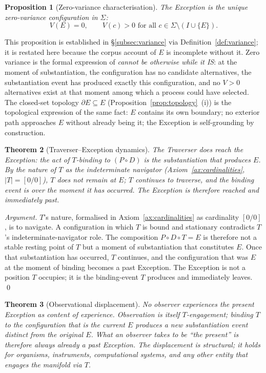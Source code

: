 \documentclass[11pt,a4paper]{article}
\newtheorem{theorem}{Theorem}[section]
\newtheorem{proposition}[theorem]{Proposition}
\theoremstyle{definition}
\theoremstyle{remark}
\begin{document}
\begin{proposition}[Zero-variance characterisation]\label{prop:E-zero-variance}
The Exception is the unique zero-variance configuration in $\Sigma$:
\[
V(E) = 0, \qquad V(c) > 0 \text{ for all } c \in \Sigma\setminus(I\cup\{E\}).
\]
\end{proposition}

This proposition is established in \S\ref{subsec:variance} via Definition~\ref{def:variance}; it is restated here because the corpus account of $E$ is incomplete without it. Zero variance is the formal expression of \emph{cannot be otherwise while it IS}: at the moment of substantiation, the configuration has no candidate alternatives, the substantiation event has produced exactly this configuration, and no $V > 0$ alternatives exist at that moment among which a process could have selected. The closed-set topology $\partial E \subseteq E$ (Proposition~\ref{prop:topology}~(i)) is the topological expression of the same fact: $E$ contains its own boundary; no exterior path approaches $E$ without already being it; the Exception is self-grounding by construction.

\begin{theorem}[Traverser--Exception dynamics]\label{thm:exception-T-dynamics}
The Traverser does reach the Exception: the act of $T$-binding to $(P\circ D)$ \emph{is} the substantiation that produces $E$. By the nature of $T$ as the indeterminate navigator (Axiom~\ref{ax:cardinalities}, $|T| = [0/0]$), $T$ does not remain at $E$; $T$ continues to traverse, and the binding event is over the moment it has occurred. The Exception is therefore reached and immediately past.
\end{theorem}

\begin{proof}[Argument]
$T$'s nature, formalised in Axiom~\ref{ax:cardinalities} as cardinality $[0/0]$, is to navigate. A configuration in which $T$ is bound and stationary contradicts $T$'s indeterminate-navigator role. The composition $P\circ D\circ T = E$ is therefore not a stable resting point of $T$ but a moment of substantiation that constitutes $E$. Once that substantiation has occurred, $T$ continues, and the configuration that was $E$ at the moment of binding becomes a past Exception. The Exception is not a position $T$ occupies; it is the binding-event $T$ produces and immediately leaves. \qed
\end{proof}

\begin{theorem}[Observational displacement]\label{thm:observational-displacement}
No observer experiences the present Exception as content of experience. Observation is itself $T$-engagement; binding $T$ to the configuration that is the current $E$ produces a new substantiation event distinct from the original $E$. What an observer takes to be ``the present'' is therefore always already a past Exception. The displacement is structural; it holds for organisms, instruments, computational systems, and any other entity that engages the manifold via $T$.
\end{theorem}
\end{document}
